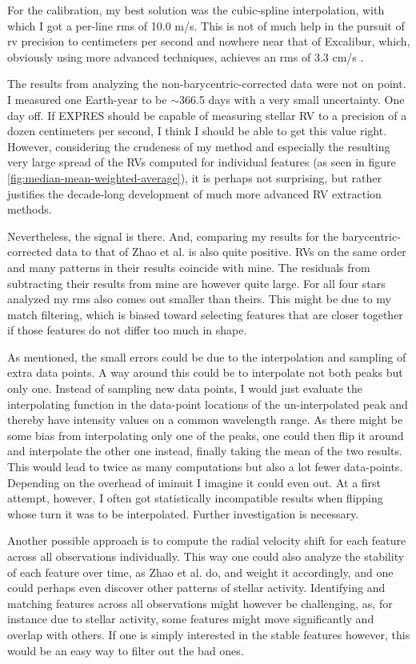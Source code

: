 
For the calibration, my best solution was the cubic-spline interpolation, with which I got a per-line rms of 10.0 m/s. This is not of much help in the pursuit of rv precision to centimeters per second and nowhere near that of Excalibur, which, obviously using more advanced techniques, achieves an rms of 3.3 cm/s \cite{zhao2021excalibur}. 

The results from analyzing the non-barycentric-corrected data were not on point. I measured one Earth-year to be $\sim$366.5 days with a very small uncertainty. One day off. If EXPRES should be capable of measuring stellar RV to a precision of a dozen centimeters per second, I think I should be able to get this value right. However, considering the crudeness of my method and especially the resulting very large spread of the RVs computed for individual features (as seen in figure \ref{fig:median-mean-weighted-average}), it is perhaps not surprising, but rather justifies the decade-long development of much more advanced RV extraction methods.

Nevertheless, the signal is there. And, comparing my results for the barycentric-corrected data to that of Zhao et al. is also quite positive. RVs on the same order and many patterns in their results coincide with mine. The residuals from subtracting their results from mine are however quite large. For all four stars analyzed my rms also comes out smaller than theirs. This might be due to my match filtering, which is biased toward selecting features that are closer together if those features do not differ too much in shape.

As mentioned, the small errors could be due to the interpolation and sampling of extra data points. A way around this could be to interpolate not both peaks but only one. Instead of sampling new data points, I would just evaluate the interpolating function in the data-point locations of the un-interpolated peak and thereby have intensity values on a common wavelength range. As there might be some bias from interpolating only one of the peaks, one could then flip it around and interpolate the other one instead, finally taking the mean of the two results. This would lead to twice as many computations but also a lot fewer data-points. Depending on the overhead of iminuit I imagine it could even out. At a first attempt, however, I often got statistically incompatible results when flipping whose turn it was to be interpolated. Further investigation is necessary.

Another possible approach is to compute the radial velocity shift for each feature across all observations individually. This way one could also analyze the stability of each feature over time, as Zhao et al. do, and weight it accordingly, and one could perhaps even discover other patterns of stellar activity. Identifying and matching features across all observations might however be challenging, as, for instance due to stellar activity, some features might move significantly and overlap with others. If one is simply interested in the stable features however, this would be an easy way to filter out the bad ones. 

